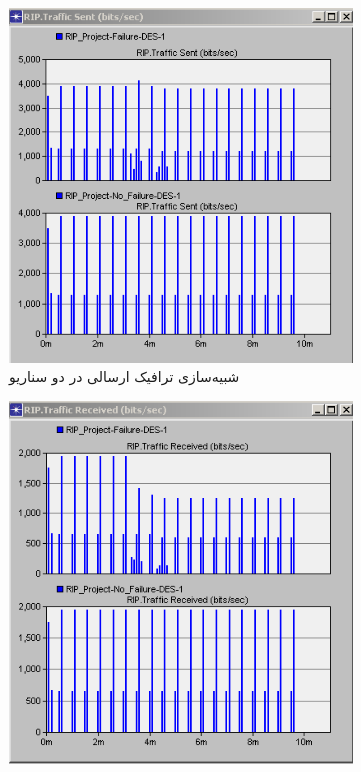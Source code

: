\documentclass[a4paper]{article}
\begin{document}
\begin{enumerate}
    \begin{figure}[h!]
        \centering
        \begin{subfigure}{0.45\textwidth}
            \centering
            \includegraphics[width=\textwidth]{./figs/traffic_sent.png}
            \caption{شبیه‌سازی ترافیک ارسالی در دو سناریو}
        \end{subfigure}
        \hfill
        \begin{subfigure}{0.45\textwidth}
            \centering
            \includegraphics[width=\textwidth]{./figs/traffic_received.png}

\end{subfigure}
\end{figure}
\end{enumerate}
\end{document}
